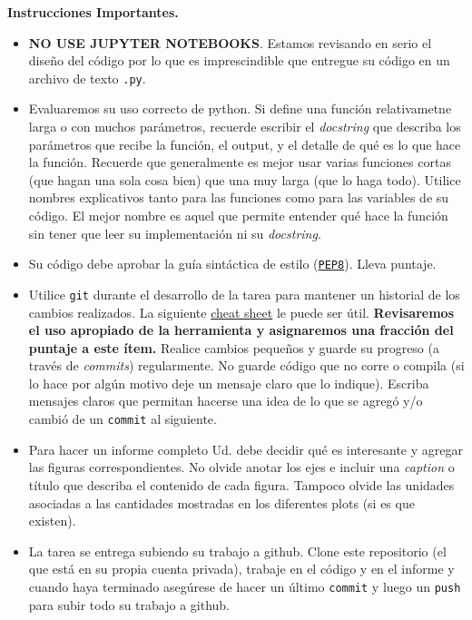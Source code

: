 \documentclass[letter, 11pt]{article}
\begin{document}
\vspace{2em}
\noindent\textbf{Instrucciones Importantes.}
\begin{itemize}

\item \textbf{NO USE JUPYTER NOTEBOOKS}. Estamos revisando en serio el diseño
  del código por lo que es imprescindible que entregue su código en un archivo
  de texto \texttt{.py}.

\item Evaluaremos su uso correcto de python. Si define una función
  relativametne larga o con muchos parámetros, recuerde escribir el
  \emph{docstring} que describa los parámetros que recibe la función, el
  output, y el detalle de qué es lo que hace la función. Recuerde que
  generalmente es mejor usar varias funciones cortas (que hagan una sola cosa
  bien) que una muy larga (que lo haga todo).  Utilice nombres explicativos
  tanto para las funciones como para las variables de su código. El mejor
  nombre es aquel que permite entender qué hace la función sin tener que leer
  su implementación ni su \emph{docstring}.

\item Su código debe aprobar la guía sintáctica de estilo
  (\href{https://www.python.org/dev/peps/pep-0008/}{\texttt{PEP8}}). Lleva
  puntaje.

\item Utilice \texttt{git} durante el desarrollo de la tarea para mantener un
  historial de los cambios realizados. La siguiente
  \href{https://education.github.com/git-cheat-sheet-education.pdf}{cheat
    sheet} le puede ser útil. {\bf Revisaremos el uso apropiado de la
  herramienta y asignaremos una fracción del puntaje a este ítem.} Realice
  cambios pequeños y guarde su progreso (a través de \emph{commits})
  regularmente. No guarde código que no corre o compila (si lo hace por algún
  motivo deje un mensaje claro que lo indique). Escriba mensajes claros que
  permitan hacerse una idea de lo que se agregó y/o cambió de un
  \texttt{commit} al siguiente.

\item Para hacer un informe completo Ud. debe decidir qué es interesante y
  agregar las figuras correspondientes. No olvide anotar los ejes e incluir una
  \emph{caption} o título que describa el contenido de cada figura. Tampoco
  olvide las unidades asociadas a las cantidades mostradas en los diferentes
  plots (si es que existen).

\item La tarea se entrega subiendo su trabajo a github. Clone este repositorio
  (el que está en su propia cuenta privada), trabaje en el código y en el
  informe y cuando haya terminado asegúrese de hacer un último \texttt{commit}
  y luego un \texttt{push} para subir todo su trabajo a github.


\end{itemize}
\end{document}
